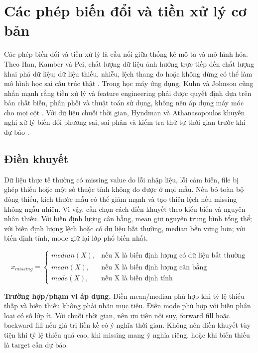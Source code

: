 \section{Các phép biến đổi và tiền xử lý cơ bản}

Các phép biến đổi và tiền xử lý là cầu nối giữa thống kê mô tả và mô hình hóa. Theo Han, Kamber và Pei, chất lượng dữ liệu ảnh hưởng trực tiếp đến chất lượng khai phá dữ liệu; dữ liệu thiếu, nhiễu, lệch thang đo hoặc không dừng có thể làm mô hình học sai cấu trúc thật \cite{Han2011DataMining}. Trong học máy ứng dụng, Kuhn và Johnson cũng nhấn mạnh rằng tiền xử lý và feature engineering phải được quyết định dựa trên bản chất biến, phân phối và thuật toán sử dụng, không nên áp dụng máy móc cho mọi cột \cite{Kuhn2019FeatureEngineering}. Với dữ liệu chuỗi thời gian, Hyndman và Athanasopoulos khuyến nghị xử lý biến đổi phương sai, sai phân và kiểm tra thứ tự thời gian trước khi dự báo \cite{Hyndman2021Forecasting}.

\subsection{Điền khuyết}

Dữ liệu thực tế thường có missing value do lỗi nhập liệu, lỗi cảm biến, file bị ghép thiếu hoặc một số thuộc tính không đo được ở mọi mẫu. Nếu bỏ toàn bộ dòng thiếu, kích thước mẫu có thể giảm mạnh và tạo thiên lệch nếu missing không ngẫu nhiên. Vì vậy, cần chọn cách điền khuyết theo kiểu biến và nguyên nhân thiếu. Với biến định lượng cân bằng, mean giữ nguyên trung bình tổng thể; với biến định lượng lệch hoặc có dữ liệu bất thường, median bền vững hơn; với biến định tính, mode giữ lại lớp phổ biến nhất.

\begin{equation}
x_{missing} =
\begin{cases}
median(X), & \text{nếu X là biến định lượng có dữ liệu bất thường} \\
mean(X), & \text{nếu X là biến định lượng cân bằng} \\
mode(X), & \text{nếu X là biến định tính}
\end{cases}
\end{equation}

\textbf{Trường hợp/phạm vi áp dụng.} Điền mean/median phù hợp khi tỷ lệ thiếu thấp và biến thiếu không phải nhãn mục tiêu. Điền mode phù hợp với biến phân loại có số lớp ít. Với chuỗi thời gian, nên ưu tiên nội suy, forward fill hoặc backward fill nếu giá trị liền kề có ý nghĩa thời gian. Không nên điền khuyết tùy tiện khi tỷ lệ thiếu quá cao, khi missing mang ý nghĩa riêng, hoặc khi biến thiếu là target cần dự báo.


